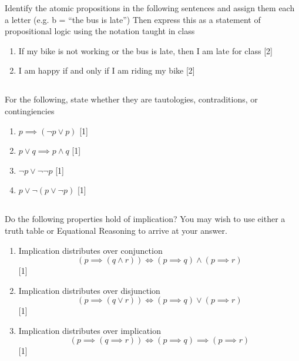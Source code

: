 \documentclass[twocolumn]{article}
\newcounter{pmarks}
\newcounter{marks}
\newcommand\mrk[1]{{\hfill\color{blue}\small[{#1}]}\addtocounter{pmarks}{#1}\addtocounter{marks}{#1}}
\begin{document}
Identify the atomic propositions in the following sentences and assign them each a letter (e.g. b = ``the bus is late'') Then express this as a statement of propositional logic using the notation taught in class

\begin{enumerate}
    \item If my bike is not working or the bus is late, then I am late for class \mrk{2}
    \item I am happy if and only if I am riding my bike \mrk{2}
\end{enumerate}

\subsection{}

For the following, state whether they are tautologies, contraditions, or contingiencies

\begin{enumerate}
    \item $p \implies (\neg p \vee p)$ \mrk{1}
    \item $p \vee q \implies p \wedge q$ \mrk{1}
    \item $\neg p \vee \neg\neg p$ \mrk{1}
    \item $p \vee \neg (p \vee \neg p) $ \mrk{1}
\end{enumerate}


\subsection{}

Do the following properties hold of implication? You may wish to use either a truth table or Equational Reasoning to arrive at your answer.

\begin{enumerate}
    \item Implication distributes over conjunction $$ (p \implies (q \wedge r)) \Longleftrightarrow (p \implies q) \wedge (p \implies r) $$ \mrk{1}
    \item Implication distributes over disjunction $$ (p \implies (q \vee r)) \Longleftrightarrow (p \implies q) \vee (p \implies r) $$ \mrk{1}
    \item Implication distributes over implication $$ (p \implies (q \implies r)) \Leftrightarrow (p \implies q) \implies (p \implies r) $$ \mrk{1}
\end{enumerate}
\end{document}
